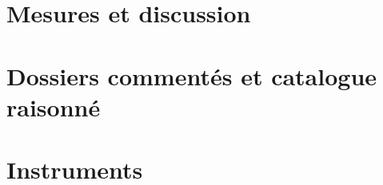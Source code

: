 \documentclass[11pt,twoside,openright]{book}
\begin{document}
\part{Mesures et discussion}





\part{Dossiers commentés et catalogue raisonné}



\part{Instruments}



\appendix


\backmatter

\end{document}
